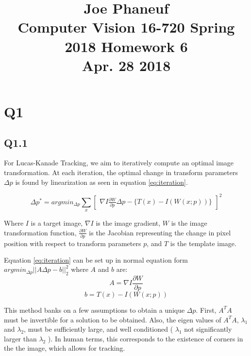 \documentclass[12pt]{article}
\begin{document}
\title{Joe Phaneuf \\ Computer Vision 16-720 Spring 2018 Homework 6 \\ Apr. 28 2018 }
\date{}
\author{}
\maketitle

\newpage


\section{Q1}
\subsection{Q1.1}
For Lucas-Kanade Tracking, we aim to iteratively compute an optimal image transformation. At each iteration, the optimal change in transform parameters $\Delta p$ is found by linearization as seen in equation \ref{eq:iteration}.

\begin{equation}
\label{eq:iteration}
\Delta p ^{*} = argmin_{\Delta p} \sum_{x}
\begin{bmatrix}
\nabla I \frac { \partial W } { \partial p } \Delta p - \{ T ( x ) - I ( W ( x ; p ) ) \}
\end{bmatrix}^{2}
\end{equation}

Where $I$ is a target image, $\nabla I$ is the image gradient, $W$ is the image transformation function, $\frac{ \partial W } { \partial p }$ is the Jacobian representing the change in pixel position with respect to transform parameters $p$, and $T$ is the template image.

Equation \ref{eq:iteration} can be set up in normal equation form $argmin_{\Delta p} || A \Delta p - b ||_{2}^{2}$ where $A$ and $b$ are:
\begin{equation}
\label{eq:A}
A =
\nabla I \frac { \partial W } { \partial p }
\end{equation}
\begin{equation}
\label{eq:A}
b = T ( x ) - I ( W ( x ; p ) )
\end{equation}

This method banks on a few assumptions to obtain a unique $\Delta p$. First, $A^{T} A$ must be invertible for a solution to be obtained. Also, the eigen values of $A^{T} A$, $\lambda_{1}$ and $\lambda_{2}$, must be sufficiently large, and well conditioned ( $\lambda_{1}$ not significantly larger than $\lambda_{2}$ ). In human terms, this corresponds to the existence of corners in the the image, which allows for tracking.
\end{document}
